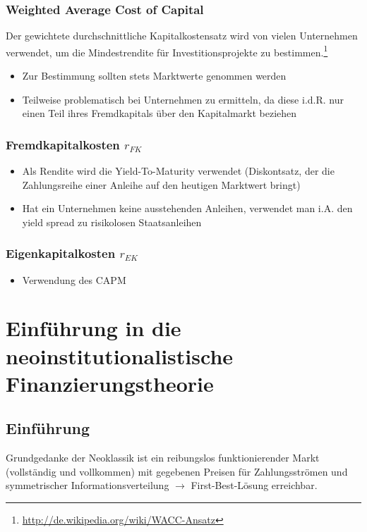 \subsubsection{Weighted Average Cost of Capital}
Der gewichtete durchschnittliche Kapitalkostensatz wird von vielen Unternehmen verwendet, um die Mindestrendite für Investitionsprojekte zu bestimmen.\footnote{\url{http://de.wikipedia.org/wiki/WACC-Ansatz}}
\begin{itemize}
	\item Zur Bestimmung sollten stets Marktwerte genommen werden
	\item Teilweise problematisch bei Unternehmen zu ermitteln, da diese i.d.R. nur einen Teil ihres Fremdkapitals über den Kapitalmarkt beziehen
\end{itemize}

\subsubsection{Fremdkapitalkosten \(r_{FK}\)}
\begin{itemize}
	\item Als Rendite wird die Yield-To-Maturity verwendet (Diskontsatz, der die Zahlungsreihe einer Anleihe auf den heutigen Marktwert bringt)
	\item Hat ein Unternehmen keine ausstehenden Anleihen, verwendet man i.A. den yield spread zu risikolosen Staatsanleihen
\end{itemize}

\subsubsection{Eigenkapitalkosten \(r_{EK}\)}
\begin{itemize}
	\item Verwendung des CAPM
\end{itemize}



\section{Einführung in die neoinstitutionalistische Finanzierungstheorie}

\subsection{Einführung}
Grundgedanke der Neoklassik ist ein reibungslos funktionierender Markt (vollständig und vollkommen) mit gegebenen Preisen für Zahlungsströmen und symmetrischer Informationsverteilung $\rightarrow$ First-Best-Lösung erreichbar.


